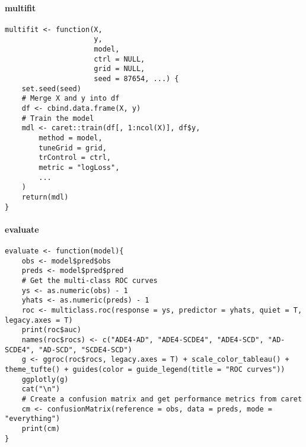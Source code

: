 \paragraph{multifit} \label{app:multifit}
\begin{verbatim}
multifit <- function(X,
                     y,
                     model,
                     ctrl = NULL,
                     grid = NULL,
                     seed = 87654, ...) {
    set.seed(seed)
    # Merge X and y into df
    df <- cbind.data.frame(X, y)
    # Train the model
    mdl <- caret::train(df[, 1:ncol(X)], df$y,
        method = model,
        tuneGrid = grid,
        trControl = ctrl,
        metric = "logLoss",
        ...
    )
    return(mdl)
}
\end{verbatim}

\paragraph{evaluate} \label{app:evaluate}

\begin{verbatim}
evaluate <- function(model){
    obs <- model$pred$obs
    preds <- model$pred$pred
    # Get the multi-class ROC curves
    ys <- as.numeric(obs) - 1
    yhats <- as.numeric(preds) - 1
    roc <- multiclass.roc(response = ys, predictor = yhats, quiet = T, legacy.axes = T)
    print(roc$auc)
    names(roc$rocs) <- c("ADE4-AD", "ADE4-SCDE4", "ADE4-SCD", "AD-SCDE4", "AD-SCD", "SCDE4-SCD")
    g <- ggroc(roc$rocs, legacy.axes = T) + scale_color_tableau() + theme_tufte() + guides(color = guide_legend(title = "ROC curves"))
    ggplotly(g)
    cat("\n")
    # Create a confusion matrix and get performance metrics from caret
    cm <- confusionMatrix(reference = obs, data = preds, mode = "everything")
    print(cm)
}    
\end{verbatim}

